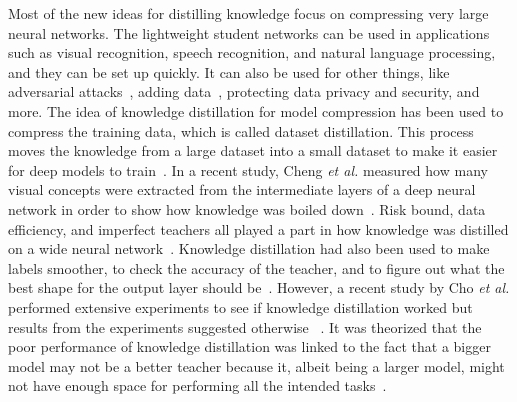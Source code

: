 Most of the new ideas for distilling knowledge focus on compressing very large neural networks. The lightweight student networks can be used in applications such as visual recognition, speech recognition, and natural language processing, and they can be set up quickly. It can also be used for other things, like adversarial attacks~\cite{papernot2016distillation}, adding data~\cite{Yuan2019RevisitKD}, protecting data privacy and security, and more. The idea of knowledge distillation for model compression has been used to compress the training data, which is called dataset distillation. This process moves the knowledge from a large dataset into a small dataset to make it easier for deep models to train~\cite{bohdal2020flexible}.
In a recent study, Cheng \textit{et al.} measured how many visual concepts were extracted from the intermediate layers of a deep neural network in order to show how knowledge was boiled down~\cite{cheng2020explaining}. Risk bound, data efficiency, and imperfect teachers all played a part in how knowledge was distilled on a wide neural network~\cite{ji2020knowledge}. Knowledge distillation had also been used to make labels smoother, to check the accuracy of the teacher, and to figure out what the best shape for the output layer should be~\cite{tang2020understanding}. However, a recent study by Cho \textit{et al.} performed extensive experiments to see if knowledge distillation worked but results from the experiments suggested otherwise ~\cite{yang2020knowledge}. It was theorized that the poor performance of knowledge distillation was linked to the fact that a bigger model may not be a better teacher because it, albeit being a larger model, might not have enough space for performing all the intended tasks~\cite{mirzadeh2020improved}. 


